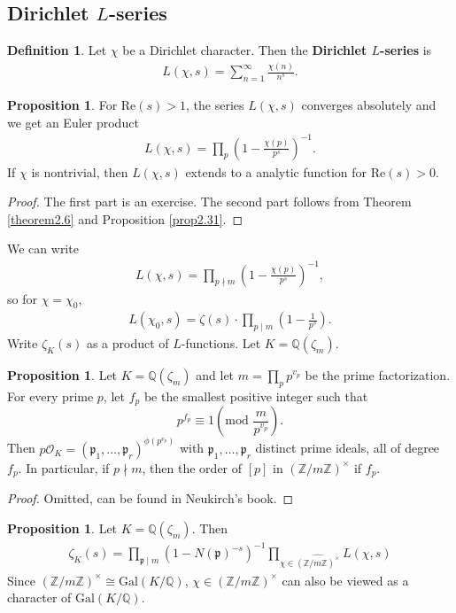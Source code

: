 \documentclass{article}
\theoremstyle{definition}
\newtheorem{prop}[theorem]{Proposition}
\newtheorem{defn}[theorem]{Definition}
\begin{document}
\subsection{Dirichlet $L$-series}
\begin{defn}\label{defn2.32}
    Let $\chi$ be a Dirichlet character. Then the \textbf{Dirichlet $L$-series} is 
    \begin{align*}
        L(\chi,s) = \sum_{n=1}^{\infty} \frac{\chi(n)}{n^s}. 
    \end{align*}
\end{defn}
\begin{prop}\label{prop2.33}
    For $\text{Re}(s)>1$, the series $L(\chi,s)$ converges absolutely and we get an Euler product 
    \begin{align*}
        L(\chi,s) = \prod_{p}^{} \left(1-\frac{\chi(p)}{p^s}\right)^{-1}.
    \end{align*}
    If $\chi$ is nontrivial, then $L(\chi,s)$ extends to a analytic function for $\text{Re}(s)>0$.
\end{prop}
\begin{proof}
    The first part is an exercise. The second part follows from Theorem \ref{theorem2.6} and Proposition \ref{prop2.31}.
\end{proof}
We can write 
\begin{align*}
    L(\chi,s) = \prod_{p \nmid m}^{} \left(1-\frac{\chi(p)}{p^s}\right)^{-1},
\end{align*}
so for $\chi = \chi_0$, 
\begin{align*}
    L(\chi_0,s) = \zeta(s) \cdot \prod_{p \mid m}^{} \left(1-\frac{1}{p^s}\right).
\end{align*}
Write $\zeta_K(s)$ as a product of $L$-functions. Let $K = \mathbb{Q}(\zeta_m)$.
\begin{prop}\label{prop2.34}
    Let $K = \mathbb{Q}(\zeta_m)$ and let $m = \prod_{p}^{} p^{v_{p}}$ be the prime factorization. For every prime $p$, let $f_p$ be the smallest positive integer such that $$p^{f_p} \equiv 1 \left(\text{mod }\frac{m}{p^{v_p}}\right).$$
    Then $p \mathcal{O}_K = (\mathfrak{p}_1,\ldots,\mathfrak{p}_r)^{\phi(p^{v_p})}$ with $\mathfrak{p}_1,\ldots,\mathfrak{p}_r$ distinct prime ideals, all of degree $f_p$. In particular, if $p \nmid m$, then the order of $[p]$ in $(\mathbb{Z}/m\mathbb{Z})^\times$ if $f_p$.
\end{prop}
\begin{proof}
    Omitted, can be found in Neukirch's book.
\end{proof}
\begin{prop}\label{prop2.35}
    Let $K = \mathbb{Q}(\zeta_m)$. Then 
    \begin{align*}
        \zeta_K(s) = \prod_{\mathfrak{p} \mid m}^{} (1-N(\mathfrak{p})^{-s})^{-1} \prod_{\chi \in \widehat{(\mathbb{Z}/m\mathbb{Z})^\times}}^{}L(\chi,s) 
    \end{align*}
    Since $(\mathbb{Z}/m\mathbb{Z})^\times \cong \text{Gal}(K/\mathbb{Q})$, $\chi \in (\mathbb{Z}/m\mathbb{Z})^\times$ can also be viewed as a character of $\text{Gal}(K/\mathbb{Q})$.
\end{prop}
\end{document}
